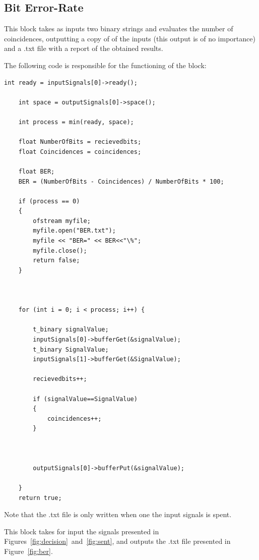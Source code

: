 \documentclass{article}
\begin{document}
\subsection{Bit Error-Rate}

This block takes as inputs two binary strings and evaluates the number of coincidences, outputting a copy of of the inputs (this output is of no importance) and a .txt file with a report of the obtained results.
\par
The following code is responsible for the functioning of the block:
\begin{verbatim}
int ready = inputSignals[0]->ready();

	int space = outputSignals[0]->space();

	int process = min(ready, space);

	float NumberOfBits = recievedbits;
	float Coincidences = coincidences;

	float BER;
	BER = (NumberOfBits - Coincidences) / NumberOfBits * 100;

	if (process == 0)
	{
		ofstream myfile;
		myfile.open("BER.txt");
		myfile << "BER=" << BER<<"\%";
		myfile.close();
		return false;
	}



	for (int i = 0; i < process; i++) {

		t_binary signalValue;
		inputSignals[0]->bufferGet(&signalValue);
		t_binary SignalValue;
		inputSignals[1]->bufferGet(&SignalValue);

		recievedbits++;

		if (signalValue==SignalValue)
		{
			coincidences++;
		}



		outputSignals[0]->bufferPut(&signalValue);

	}
	return true;
\end{verbatim}
Note that the .txt file is only written when one the input signals is spent.
\par
This block takes for input the signals presented in Figures~\ref{fig:decision}~and~\ref{fig:sent}, and outputs the .txt file presented in Figure~\ref{fig:ber}.
\end{document}
